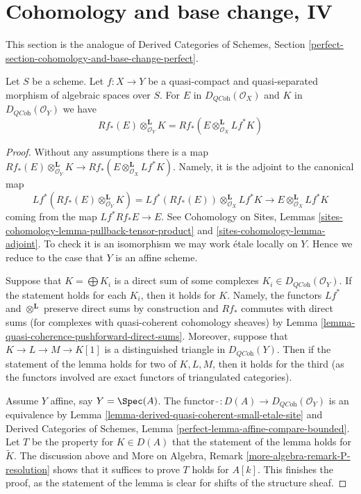\section{Cohomology and base change, IV}
\label{section-cohomology-and-base-change-perfect}

\noindent
This section is the analogue of Derived Categories of Schemes, Section
\ref{perfect-section-cohomology-and-base-change-perfect}.

\begin{lemma}
\label{lemma-cohomology-base-change}
Let $S$ be a scheme. Let $f : X \to Y$ be a quasi-compact and quasi-separated
morphism of algebraic spaces over $S$. For $E$ in
$D_{\textit{QCoh}}(\mathcal{O}_X)$ and
$K$ in $D_{\textit{QCoh}}(\mathcal{O}_Y)$ we have
$$
Rf_*(E) \otimes_{\mathcal{O}_Y}^\mathbf{L} K =
Rf_*(E \otimes_{\mathcal{O}_X}^\mathbf{L} Lf^*K)
$$
\end{lemma}

\begin{proof}
Without any assumptions there is a map
$Rf_*(E) \otimes_{\mathcal{O}_Y}^\mathbf{L} K \to
Rf_*(E \otimes_{\mathcal{O}_X}^\mathbf{L} Lf^*K)$.
Namely, it is the adjoint to the canonical map
$$
Lf^*(Rf_*(E) \otimes_{\mathcal{O}_Y}^\mathbf{L} K) =
Lf^*(Rf_*(E)) \otimes_{\mathcal{O}_X}^\mathbf{L} Lf^*K
\longrightarrow
E \otimes_{\mathcal{O}_X}^\mathbf{L} Lf^*K
$$
coming from the map $Lf^*Rf_*E \to E$. See
Cohomology on Sites, Lemmas
\ref{sites-cohomology-lemma-pullback-tensor-product} and
\ref{sites-cohomology-lemma-adjoint}.
To check it is an isomorphism we may work \'etale locally on $Y$.
Hence we reduce to the case that $Y$ is an affine scheme.

\medskip\noindent
Suppose that $K = \bigoplus K_i$ is a direct
sum of some complexes $K_i \in D_{\textit{QCoh}}(\mathcal{O}_Y)$.
If the statement holds for each $K_i$, then it holds for $K$.
Namely, the functors $Lf^*$ and $\otimes^\mathbf{L}$ preserve
direct sums by construction and $Rf_*$ commutes with direct sums
(for complexes with quasi-coherent cohomology sheaves) by
Lemma \ref{lemma-quasi-coherence-pushforward-direct-sums}.
Moreover, suppose that $K \to L \to M \to K[1]$ is a distinguished
triangle in $D_{\textit{QCoh}}(Y)$. Then if the statement of the
lemma holds for two of $K, L, M$, then it holds for the third
(as the functors involved are exact functors of triangulated categories).

\medskip\noindent
Assume $Y$ affine, say $Y = \Spec(A)$. The functor
$\widetilde{\ } : D(A) \to D_\textit{QCoh}(\mathcal{O}_Y)$ is an equivalence
by
Lemma \ref{lemma-derived-quasi-coherent-small-etale-site} and
Derived Categories of Schemes,
Lemma \ref{perfect-lemma-affine-compare-bounded}.
Let $T$ be the property for $K \in D(A)$ that
the statement of the lemma holds for $\widetilde{K}$.
The discussion above and
More on Algebra, Remark \ref{more-algebra-remark-P-resolution}
shows that it suffices to prove $T$ holds for $A[k]$.
This finishes the proof, as the statement of the lemma
is clear for shifts of the structure sheaf.
\end{proof}

